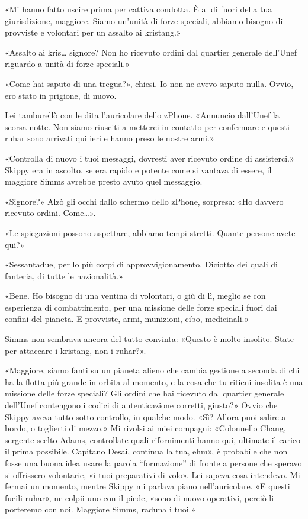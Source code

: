 «Mi hanno fatto uscire prima per cattiva condotta. È al di fuori della
tua giurisdizione, maggiore. Siamo un'unità di forze speciali, abbiamo
bisogno di provviste e volontari per un assalto ai kristang.»

«Assalto ai kris\ldots{} signore? Non ho ricevuto ordini dal quartier
generale dell'Unef riguardo a unità di forze speciali.»

«Come hai saputo di una tregua?», chiesi. Io non ne avevo saputo nulla.
Ovvio, ero stato in prigione, di nuovo.

Lei tamburellò con le dita l'auricolare dello zPhone. «Annuncio
dall'Unef la scorsa notte. Non siamo riusciti a metterci in contatto per
confermare e questi ruhar sono arrivati qui ieri e hanno preso le nostre
armi.»

«Controlla di nuovo i tuoi messaggi, dovresti aver ricevuto ordine di
assisterci.» Skippy era in ascolto, se era rapido e potente come si
vantava di essere, il maggiore Simms avrebbe presto avuto quel
messaggio.

«Signore?» Alzò gli occhi dallo schermo dello zPhone, sorpresa: «Ho
davvero ricevuto ordini. Come\ldots».

«Le spiegazioni possono aspettare, abbiamo tempi stretti. Quante persone
avete qui?»

«Sessantadue, per lo più corpi di approvvigionamento. Diciotto dei quali
di fanteria, di tutte le nazionalità.»

«Bene. Ho bisogno di una ventina di volontari, o giù di lì, meglio se
con esperienza di combattimento, per una missione delle forze speciali
fuori dai confini del pianeta. E provviste, armi, munizioni, cibo,
medicinali.»

Simms non sembrava ancora del tutto convinta: «Questo è molto insolito.
State per attaccare i kristang, non i ruhar?».

«Maggiore, siamo fanti su un pianeta alieno che cambia gestione a
seconda di chi ha la flotta più grande in orbita al momento, e la cosa
che tu ritieni insolita è una missione delle forze speciali? Gli ordini
che hai ricevuto dal quartier generale dell'Unef contengono i codici di
autenticazione corretti, giusto?» Ovvio che Skippy aveva tutto sotto
controllo, in qualche modo. «Sì? Allora puoi salire a bordo, o toglierti
di mezzo.» Mi rivolsi ai miei compagni: «Colonnello Chang, sergente
scelto Adams, controllate quali rifornimenti hanno qui, ultimate il
carico il prima possibile. Capitano Desai, continua la tua, ehm», è
probabile che non fosse una buona idea usare la parola ``formazione'' di
fronte a persone che speravo si offrissero volontarie, «i tuoi
preparativi di volo». Lei sapeva cosa intendevo. Mi fermai un momento,
mentre Skippy mi parlava piano nell'auricolare. «E questi fucili ruhar»,
ne colpii uno con il piede, «sono di nuovo operativi, perciò li
porteremo con noi. Maggiore Simms, raduna i tuoi.»

